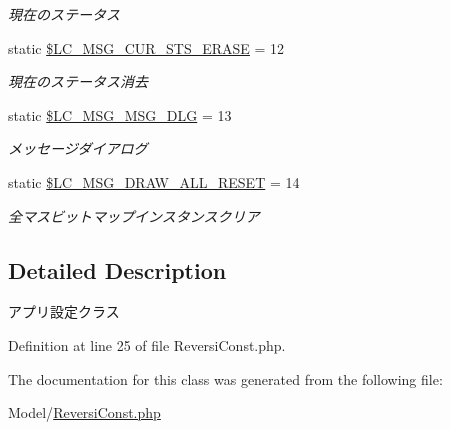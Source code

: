 \begin{DoxyCompactItemize}
\begin{DoxyCompactList}\small\item\em 現在のステータス \end{DoxyCompactList}\item 
static \hyperlink{class_reversi_const_a820a0338238bbd1f21c29b63aadbf2c8}{\$\+L\+C\+\_\+\+M\+S\+G\+\_\+\+C\+U\+R\+\_\+\+S\+T\+S\+\_\+\+E\+R\+A\+SE} = 12\hypertarget{class_reversi_const_a820a0338238bbd1f21c29b63aadbf2c8}{}\label{class_reversi_const_a820a0338238bbd1f21c29b63aadbf2c8}

\begin{DoxyCompactList}\small\item\em 現在のステータス消去 \end{DoxyCompactList}\item 
static \hyperlink{class_reversi_const_a11bb64ddfba78520e7864e0fe8aa89d1}{\$\+L\+C\+\_\+\+M\+S\+G\+\_\+\+M\+S\+G\+\_\+\+D\+LG} = 13\hypertarget{class_reversi_const_a11bb64ddfba78520e7864e0fe8aa89d1}{}\label{class_reversi_const_a11bb64ddfba78520e7864e0fe8aa89d1}

\begin{DoxyCompactList}\small\item\em メッセージダイアログ \end{DoxyCompactList}\item 
static \hyperlink{class_reversi_const_ab474e9969881fca250d354949405d7d8}{\$\+L\+C\+\_\+\+M\+S\+G\+\_\+\+D\+R\+A\+W\+\_\+\+A\+L\+L\+\_\+\+R\+E\+S\+ET} = 14\hypertarget{class_reversi_const_ab474e9969881fca250d354949405d7d8}{}\label{class_reversi_const_ab474e9969881fca250d354949405d7d8}

\begin{DoxyCompactList}\small\item\em 全マスビットマップインスタンスクリア \end{DoxyCompactList}\end{DoxyCompactItemize}


\subsection{Detailed Description}
アプリ設定クラス 

Definition at line 25 of file Reversi\+Const.\+php.



The documentation for this class was generated from the following file\+:\begin{DoxyCompactItemize}
\item 
Model/\hyperlink{_reversi_const_8php}{Reversi\+Const.\+php}\end{DoxyCompactItemize}
